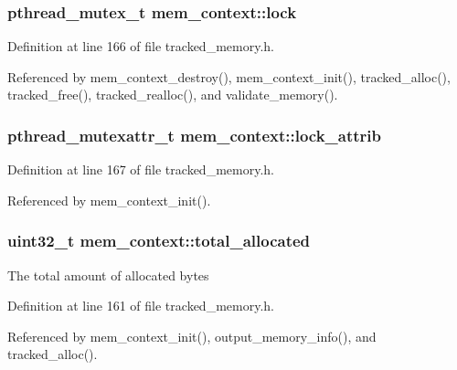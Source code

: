 \subsubsection[{lock}]{\setlength{\rightskip}{0pt plus 5cm}pthread\-\_\-mutex\-\_\-t mem\-\_\-context\-::lock}\label{structmem__context_a0ab6d63011eb813840718d80623e16c9}


Definition at line 166 of file tracked\-\_\-memory.\-h.



Referenced by mem\-\_\-context\-\_\-destroy(), mem\-\_\-context\-\_\-init(), tracked\-\_\-alloc(), tracked\-\_\-free(), tracked\-\_\-realloc(), and validate\-\_\-memory().

\subsubsection[{lock\-\_\-attrib}]{\setlength{\rightskip}{0pt plus 5cm}pthread\-\_\-mutexattr\-\_\-t mem\-\_\-context\-::lock\-\_\-attrib}\label{structmem__context_a270a8ee10aed0945ffbbfc1a806794c3}


Definition at line 167 of file tracked\-\_\-memory.\-h.



Referenced by mem\-\_\-context\-\_\-init().

\subsubsection[{total\-\_\-allocated}]{\setlength{\rightskip}{0pt plus 5cm}uint32\-\_\-t mem\-\_\-context\-::total\-\_\-allocated}\label{structmem__context_a513b900aa111101d2491b1395912e7a1}
The total amount of allocated bytes 

Definition at line 161 of file tracked\-\_\-memory.\-h.



Referenced by mem\-\_\-context\-\_\-init(), output\-\_\-memory\-\_\-info(), and tracked\-\_\-alloc().

